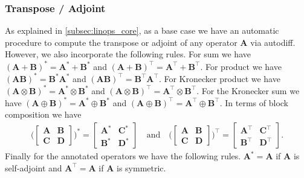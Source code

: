 \documentclass{article}
\newcommand{\mbf}[1]{{\boldsymbol{\mathbf{#1}}}}
\renewcommand{\bm}{\mbf}
\begin{document}
\subsubsection{Transpose / Adjoint}
As explained in \autoref{subsec:linops_core}, as a base case we have an automatic procedure to compute the transpose or adjoint of any operator $\bm{A}$ via autodiff.
However, we also incorporate the following rules.
For sum we have $\left(\bm{A} + \bm{B}\right)^{*} = \bm{A}^{*} + \bm{B}^{*}$ and $\left(\bm{A} + \bm{B}\right)^{\intercal} = \bm{A}^{\intercal} + \bm{B}^{\intercal}$.
For product we have $\left(\bm{A} \bm{B}\right)^{*} = \bm{B}^{*}\bm{A}^{*} $ and $\left(\bm{A} \bm{B}\right)^{\intercal} = \bm{B}^{\intercal} \bm{A}^{\intercal}$.
For Kronecker product we have $\left(\bm{A} \otimes \bm{B}\right)^{*} = \bm{A}^{*} \otimes \bm{B}^{*}$ and
$\left(\bm{A} \otimes \bm{B}\right)^{\intercal} = \bm{A}^{\intercal} \otimes \bm{B}^{\intercal}$.
For the Kronecker sum we have $\left(\bm{A} \oplus \bm{B}\right)^{*} = \bm{A}^{*} \oplus \bm{B}^{*}$
and $\left(\bm{A} \oplus \bm{B}\right)^{\intercal} = \bm{A}^{\intercal} \oplus \bm{B}^{\intercal}$.
In terms of block composition we have
\begin{equation*}
    \begin{split}
      \bigg({\begin{bmatrix} \bm{A} & \bm{B} \\ \bm{C} & \bm{D} \end{bmatrix} }\bigg)^{*}
        =
      {\begin{bmatrix} \bm{A}^{*} & \bm{C}^{*} \\ \bm{B}^{*} & \bm{D}^{*} \end{bmatrix} }
        \quad \text{and} \quad
      \bigg({\begin{bmatrix} \bm{A} & \bm{B} \\ \bm{C} & \bm{D} \end{bmatrix} }\bigg)^{\intercal}
        =
      {\begin{bmatrix} \bm{A}^{\intercal} & \bm{C}^{\intercal} \\ \bm{B}^{\intercal} & \bm{D}^{\intercal} \end{bmatrix} }
        .
    \end{split}
\end{equation*}
Finally for the annotated operators we have the following rules.
$\bm{A}^{*} = \bm{A}$ if $\bm{A}$ is self-adjoint and $\bm{A}^{\intercal} = \bm{A}$ if $\bm{A}$ is symmetric.
\end{document}
